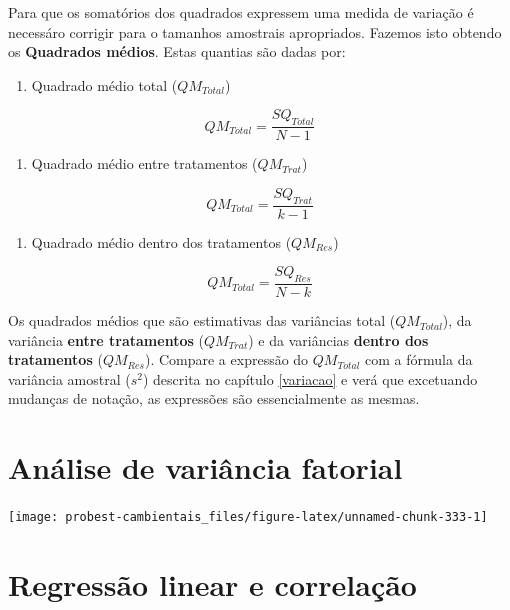 \documentclass[
]{book}
\providecommand{\tightlist}{%
  \setlength{\itemsep}{0pt}\setlength{\parskip}{0pt}}
\begin{document}
Para que os somatórios dos quadrados expressem uma medida de variação é necessáro corrigir para o tamanhos amostrais apropriados. Fazemos isto obtendo os \textbf{Quadrados médios}. Estas quantias são dadas por:

\begin{enumerate}
\def\labelenumi{\arabic{enumi}.}
\tightlist
\item
  Quadrado médio total (\(QM_{Total}\))
\end{enumerate}

\[QM_{Total} = \frac{SQ_{Total}}{N -1}\]

\begin{enumerate}
\def\labelenumi{\arabic{enumi}.}
\setcounter{enumi}{1}
\tightlist
\item
  Quadrado médio entre tratamentos (\(QM_{Trat}\))
\end{enumerate}

\[QM_{Total} = \frac{SQ_{Trat}}{k - 1}\]

\begin{enumerate}
\def\labelenumi{\arabic{enumi}.}
\setcounter{enumi}{2}
\tightlist
\item
  Quadrado médio dentro dos tratamentos (\(QM_{Res}\))
\end{enumerate}

\[QM_{Total} = \frac{SQ_{Res}}{N-k}\]

Os quadrados médios que são estimativas das variâncias total (\(QM_{Total}\)), da variância \textbf{entre tratamentos} (\(QM_{Trat}\)) e da variâncias \textbf{dentro dos tratamentos} (\(QM_{Res}\)). Compare a expressão do \(QM_{Total}\) com a fórmula da variância amostral (\(s^2\)) descrita no capítulo \ref{variacao} e verá que excetuando mudanças de notação, as expressões são essencialmente as mesmas.

\hypertarget{anovafatorial}{%
\chapter{Análise de variância fatorial}\label{anovafatorial}}

\begin{center}\texttt{[image: probest-cambientais\_files/figure-latex/unnamed-chunk-333-1]} \end{center}

\hypertarget{regressao}{%
\chapter{Regressão linear e correlação}\label{regressao}}
\end{document}
